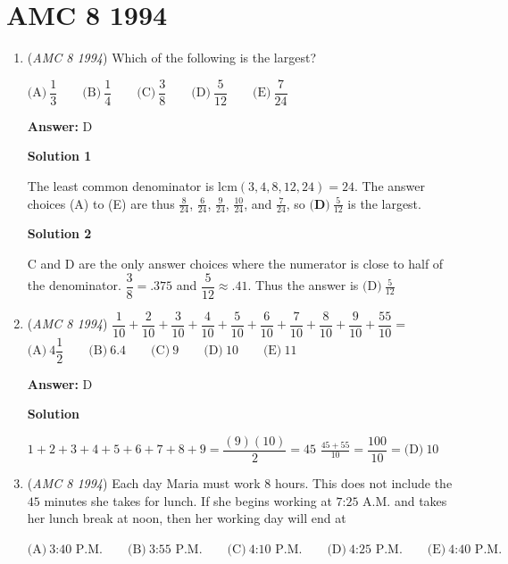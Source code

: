 \section{AMC 8 1994}
        \begin{enumerate}
        	\item (\textit{AMC 8 1994}) Which of the following is the largest?


 $\text{(A)}\ \dfrac{1}{3} \qquad \text{(B)}\ \dfrac{1}{4} \qquad \text{(C)}\ \dfrac{3}{8} \qquad \text{(D)}\ \dfrac{5}{12} \qquad \text{(E)}\ \dfrac{7}{24}$

 \textbf{Answer: }D



\textbf{Solution 1}

The least common denominator is $\mathrm{lcm}(3, 4, 8, 12, 24) = 24$. The answer choices (A) to (E) are thus $\frac{8}{24}$, $\frac{6}{24}$, $\frac{9}{24}$, $\frac{10}{24}$, and $\frac{7}{24}$, so  $\boxed{\textbf{(D)}\ \frac{5}{12}}$ is the largest.

 



\textbf{Solution 2}

C and D are the only answer choices where the numerator is close to half of the denominator. $\dfrac{3}{8} = .375$ and $\dfrac{5}{12} \approx .41$. Thus the answer is $\boxed{\text{(D)}\ \frac{5}{12}}$



	\item (\textit{AMC 8 1994}) $\dfrac{1}{10}+\dfrac{2}{10}+\dfrac{3}{10}+\dfrac{4}{10}+\dfrac{5}{10}+\dfrac{6}{10}+\dfrac{7}{10}+\dfrac{8}{10}+\dfrac{9}{10}+\dfrac{55}{10}=$
$\text{(A)}\ 4\dfrac{1}{2} \qquad \text{(B)}\ 6.4 \qquad \text{(C)}\ 9 \qquad \text{(D)}\ 10 \qquad \text{(E)}\ 11$

 \textbf{Answer: }D



\textbf{Solution}

$1+ 2+ 3 + 4 + 5 + 6 + 7 + 8 + 9 = \dfrac{(9)(10)}{2} = 45$
$\frac{45+55}{10} = \dfrac{100}{10} = \boxed{\text{(D)}\ 10}$



	\item (\textit{AMC 8 1994}) Each day Maria must work $8$ hours.  This does not include the $45$ minutes she takes for lunch.  If she begins working at $\text{7:25 A.M.}$ and takes her lunch break at noon, then her working day will end at


 $\text{(A)}\ \text{3:40 P.M.} \qquad \text{(B)}\ \text{3:55 P.M.} \qquad \text{(C)}\ \text{4:10 P.M.} \qquad \text{(D)}\ \text{4:25 P.M.} \qquad \text{(E)}\ \text{4:40 P.M.}$


\end{enumerate}
